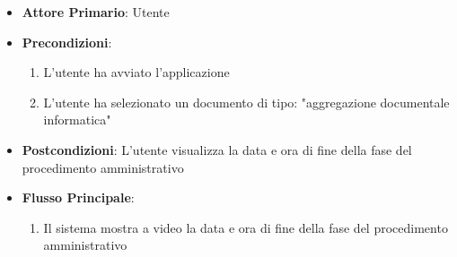 \begin{itemize}
    \item \textbf{Attore Primario}: Utente
    \item \textbf{Precondizioni}:
    \begin{enumerate}
        \item L'utente ha avviato l'applicazione
        \item L'utente ha selezionato un documento di tipo: "aggregazione documentale informatica"
    \end{enumerate}
    \item \textbf{Postcondizioni}: L'utente visualizza la data e ora di fine della fase del procedimento amministrativo
    \item \textbf{Flusso Principale}: 
    \begin{enumerate}
        \item Il sistema mostra a video la data e ora di fine della fase del procedimento amministrativo
    \end{enumerate}
\end{itemize}

